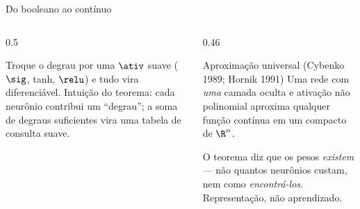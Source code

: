 \documentclass[aspectratio=169, 11pt]{beamer}
\begin{document}
\begin{frame}{Do booleano ao contínuo}
  \begin{columns}[T]
    \begin{column}{0.5\textwidth}
      \begin{center}
      \end{center}
      \small Troque o degrau por uma $\ativ$ suave ($\sig$, tanh,
      $\relu$) e tudo vira diferenciável. Intuição do teorema: cada
      neurônio contribui um ``degrau''; a soma de degraus suficientes vira
      uma tabela de consulta suave.
    \end{column}
    \begin{column}{0.46\textwidth}
      \begin{teobox}{Aproximação universal (Cybenko 1989; Hornik 1991)}
        Uma rede com \emph{uma} camada oculta e ativação não polinomial
        aproxima qualquer função contínua em um compacto de $\R^n$.
      \end{teobox}
      \vspace{-0.25em}
      \begin{alertabox}
        O teorema diz que os pesos \emph{existem} — não quantos neurônios
        custam, nem como \emph{encontrá-los}. Representação, não aprendizado.
      \end{alertabox}
    \end{column}
  \end{columns}

\end{frame}
\end{document}
